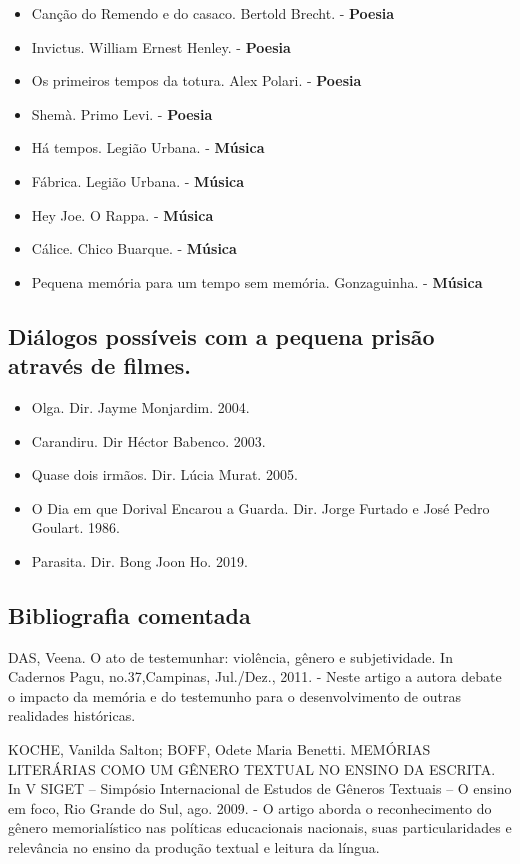 \documentclass[11pt]{extarticle}
\begin{document}
\begin{itemize}
\item
  Canção do Remendo e do casaco. Bertold Brecht. - \textbf{Poesia}
\item
  Invictus. William Ernest Henley. - \textbf{Poesia}
\item
  Os primeiros tempos da totura. Alex Polari. - \textbf{Poesia}
\item
  Shemà. Primo Levi. - \textbf{Poesia}
\item
  Há tempos. Legião Urbana. - \textbf{Música}
\item
  Fábrica. Legião Urbana. - \textbf{Música}
\item
  Hey Joe. O Rappa. - \textbf{Música}
\item
  Cálice. Chico Buarque. - \textbf{Música}
\item
  Pequena memória para um tempo sem memória. Gonzaguinha. -
  \textbf{Música}
\end{itemize}

\subsection{{Diálogos possíveis com a pequena prisão através de filmes.}}

\begin{itemize}
\item
  Olga. Dir. Jayme Monjardim. 2004.
\item
  Carandiru. Dir Héctor Babenco. 2003.
\item
  Quase dois irmãos. Dir. Lúcia Murat. 2005.
\item
  O Dia em que Dorival Encarou a Guarda. Dir. Jorge Furtado e José Pedro
  Goulart. 1986.
\item
  Parasita. Dir. Bong Joon Ho. 2019.
\end{itemize}

\subsection{Bibliografia comentada}

DAS, Veena. O ato de testemunhar: violência, gênero e subjetividade. In
Cadernos Pagu, no.37,Campinas, Jul./Dez., 2011. - Neste artigo a autora
debate o impacto da memória e do testemunho para o desenvolvimento de
outras realidades históricas.

KOCHE, Vanilda Salton; BOFF, Odete Maria Benetti. MEMÓRIAS LITERÁRIAS
COMO UM GÊNERO TEXTUAL NO ENSINO DA ESCRITA. In V SIGET -- Simpósio
Internacional de Estudos de Gêneros Textuais -- O ensino em foco, Rio
Grande do Sul, ago. 2009. - O artigo aborda o reconhecimento do gênero
memorialístico nas políticas educacionais nacionais, suas
particularidades e relevância no ensino da produção textual e leitura da
língua.
\end{document}
